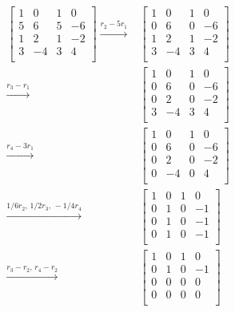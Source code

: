 \documentclass[12pt]{article} %
\begin{document}
\begin{homeworkProblem}
    \begin{align*}
        \begin{bmatrix}
            1 & 0  & 1 & 0  \\
            5 & 6  & 5 & -6 \\
            1 & 2  & 1 & -2 \\
            3 & -4 & 3 & 4  \\
        \end{bmatrix}
        \xrightarrow{r_2 - 5r_1}
         & \begin{bmatrix}
               1 & 0  & 1 & 0  \\
               0 & 6  & 0 & -6 \\
               1 & 2  & 1 & -2 \\
               3 & -4 & 3 & 4  \\
           \end{bmatrix} \\
        \xrightarrow{r_3 - r_1}
         & \begin{bmatrix}
               1 & 0  & 1 & 0  \\
               0 & 6  & 0 & -6 \\
               0 & 2  & 0 & -2 \\
               3 & -4 & 3 & 4  \\
           \end{bmatrix} \\
        \xrightarrow{r_4 - 3r_1}
         & \begin{bmatrix}
               1 & 0  & 1 & 0  \\
               0 & 6  & 0 & -6 \\
               0 & 2  & 0 & -2 \\
               0 & -4 & 0 & 4  \\
           \end{bmatrix} \\
        \xrightarrow{1/6 r_2 \text{, }  1/2 r_3 \text{, } -1/4r_4}
         & \begin{bmatrix}
               1 & 0 & 1 & 0  \\
               0 & 1 & 0 & -1 \\
               0 & 1 & 0 & -1 \\
               0 & 1 & 0 & -1 \\
           \end{bmatrix}  \\
        \xrightarrow{r_3 - r_2 \text{, } r_4 - r_2}
         & \begin{bmatrix}
               1 & 0 & 1 & 0  \\
               0 & 1 & 0 & -1 \\
               0 & 0 & 0 & 0  \\
               0 & 0 & 0 & 0  \\
           \end{bmatrix}  \\
    \end{align*}


\end{homeworkProblem}
\end{document}
